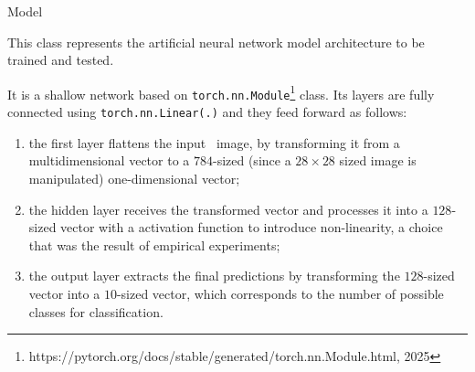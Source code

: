 \begin{subsection}{Model}
    \par This class represents the artificial neural network model architecture to be trained and tested.
    \par It is a shallow network based on \texttt{torch.nn.Module}\footnote{https://pytorch.org/docs/stable/generated/torch.nn.Module.html, 2025} class. Its layers are fully connected using \texttt{torch.nn.Linear(.)} and they feed forward as follows:
    \begin{enumerate}
        \item the first layer flattens the input~ image, by transforming it from a multidimensional vector to a $784$-sized (since a $28 \times 28$ sized image is manipulated) one-dimensional vector;
        \item the hidden layer receives the transformed vector and processes it into a $128$-sized vector with a  activation function to introduce non-linearity, a choice that was the result of empirical experiments;
        \item the output layer extracts the final predictions by transforming the $128$-sized vector into a $10$-sized vector, which corresponds to the number of possible classes for classification.
    \end{enumerate}
\end{subsection}